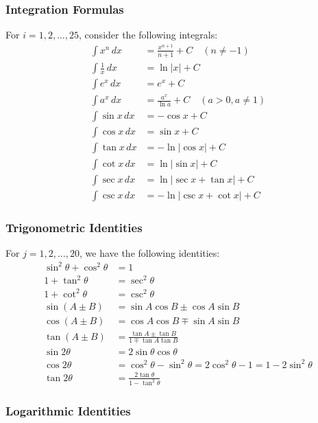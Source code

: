 \documentclass[12pt]{article}
\begin{document}
\subsubsection{Integration Formulas}

For $i = 1, 2, \ldots, 25$, consider the following integrals:
\begin{align}
\int x^n \, dx &= \frac{x^{n+1}}{n+1} + C \quad (n \neq -1) \\
\int \frac{1}{x} \, dx &= \ln|x| + C \\
\int e^x \, dx &= e^x + C \\
\int a^x \, dx &= \frac{a^x}{\ln a} + C \quad (a > 0, a \neq 1) \\
\int \sin x \, dx &= -\cos x + C \\
\int \cos x \, dx &= \sin x + C \\
\int \tan x \, dx &= -\ln|\cos x| + C \\
\int \cot x \, dx &= \ln|\sin x| + C \\
\int \sec x \, dx &= \ln|\sec x + \tan x| + C \\
\int \csc x \, dx &= -\ln|\csc x + \cot x| + C
\end{align}

\subsubsection{Trigonometric Identities}

For $j = 1, 2, \ldots, 20$, we have the following identities:
\begin{align}
\sin^2 \theta + \cos^2 \theta &= 1 \\
1 + \tan^2 \theta &= \sec^2 \theta \\
1 + \cot^2 \theta &= \csc^2 \theta \\
\sin(A \pm B) &= \sin A \cos B \pm \cos A \sin B \\
\cos(A \pm B) &= \cos A \cos B \mp \sin A \sin B \\
\tan(A \pm B) &= \frac{\tan A \pm \tan B}{1 \mp \tan A \tan B} \\
\sin 2\theta &= 2 \sin \theta \cos \theta \\
\cos 2\theta &= \cos^2 \theta - \sin^2 \theta = 2\cos^2 \theta - 1 = 1 - 2\sin^2 \theta \\
\tan 2\theta &= \frac{2 \tan \theta}{1 - \tan^2 \theta}
\end{align}

\subsubsection{Logarithmic Identities}
\end{document}
